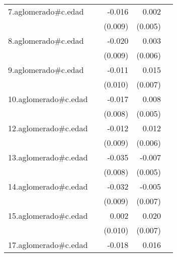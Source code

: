 {\begin{longtable}{l*{4}{D{.}{.}{-1}}}
\addlinespace
7.aglomerado#c.edad&                     &      -0.016         &       0.002         &                     \\
            &                     &     (0.009)         &     (0.005)         &                     \\
\addlinespace
8.aglomerado#c.edad&                     &      -0.020\sym{*}  &       0.003         &                     \\
            &                     &     (0.009)         &     (0.006)         &                     \\
\addlinespace
9.aglomerado#c.edad&                     &      -0.011         &       0.015\sym{*}  &                     \\
            &                     &     (0.010)         &     (0.007)         &                     \\
\addlinespace
10.aglomerado#c.edad&                     &      -0.017\sym{*}  &       0.008         &                     \\
            &                     &     (0.008)         &     (0.005)         &                     \\
\addlinespace
12.aglomerado#c.edad&                     &      -0.012         &       0.012\sym{*}  &                     \\
            &                     &     (0.009)         &     (0.006)         &                     \\
\addlinespace
13.aglomerado#c.edad&                     &      -0.035\sym{***}&      -0.007         &                     \\
            &                     &     (0.008)         &     (0.005)         &                     \\
\addlinespace
14.aglomerado#c.edad&                     &      -0.032\sym{***}&      -0.005         &                     \\
            &                     &     (0.009)         &     (0.007)         &                     \\
\addlinespace
15.aglomerado#c.edad&                     &       0.002         &       0.020\sym{**} &                     \\
            &                     &     (0.010)         &     (0.007)         &                     \\
\addlinespace
17.aglomerado#c.edad&                     &      -0.018         &       0.016\sym{*}  &                     \\

\end{longtable}}
